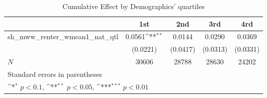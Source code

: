 \begin{table}[htbp]\centering
\def\sym#1{\ifmmode^{#1}\else\(^{#1}\)\fi}
\caption{Cumulative Effect by Demographics' quartiles}
\begin{tabular}{l*{4}{c}}
\hline\hline
            &\multicolumn{1}{c}{1st}&\multicolumn{1}{c}{2nd}&\multicolumn{1}{c}{3rd}&\multicolumn{1}{c}{4rd}\\
\hline
sh\_mww\_renter\_wmean1\_nat\_qtl&      0.0561\sym{**} &      0.0144         &      0.0290         &      0.0369         \\
            &    (0.0221)         &    (0.0417)         &    (0.0313)         &    (0.0331)         \\
\hline
\(N\)       &       30606         &       28788         &       28630         &       24202         \\
\hline\hline
\multicolumn{5}{l}{\footnotesize Standard errors in parentheses}\\
\multicolumn{5}{l}{\footnotesize \sym{*} \(p<0.1\), \sym{**} \(p<0.05\), \sym{***} \(p<0.01\)}\\
\end{tabular}
\end{table}

